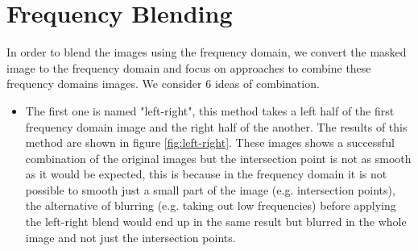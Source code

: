 \section{Frequency Blending}

In order to blend the images using the frequency domain, we convert the masked image to the frequency domain and focus on approaches to combine these frequency domains images. We consider 6 ideas of combination. 

\begin{itemize}
\item The first one is named "left-right", this method takes a left half of the first frequency domain image and the right half of the another. The results of this method are shown in figure \ref{fig:left-right}. These images shows a successful combination of the original images but the intersection point is not as smooth as it would be expected, this is because in the frequency domain it is not possible to smooth just a small part of the image (e.g. intersection points), the alternative of blurring (e.g. taking out low frequencies) before applying the left-right blend would end up in the same result but blurred in the whole image and not just the intersection points.


\end{itemize}
